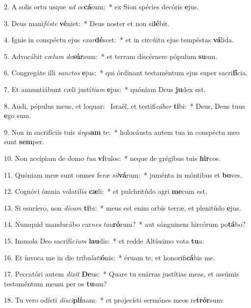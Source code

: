 2. A solis ortu usque \textit{ad} \textit{oc}\textbf{cá}sum:~*  ex Sion spécies decóris \textbf{e}jus.\

3. Deus mani\textit{fés}\textit{te} \textbf{vé}niet:~*  Deus noster et non si\textbf{lé}bit.\

4. Ignis in conspéctu ejus \textit{ex}\textit{ar}\textbf{dé}scet:~*  et in circúitu ejus tempéstas \textbf{vá}lida.\

5. Advocábit cæ\textit{lum} \textit{de}\textbf{súr}sum:~*  et terram discérnere pópulum \textbf{su}um.\

6. Congregáte illi \textit{sanc}\textit{tos} \textbf{e}jus:~*  qui órdinant testaméntum ejus super sacri\textbf{fí}cia.\

7. Et annuntiábunt cæli justí\textit{ti}\textit{am} \textbf{e}jus:~*  quóniam Deus \textbf{ju}dex est.\

8. Audi, pópulus meus, et loquar: \dag\  Israël, et testifi\textit{cá}\textit{bor} \textbf{ti}bi:~*  Deus, Deus tuus \textbf{e}go sum.\

9. Non in sacrifíciis tuis \textit{ár}\textit{gu}\textbf{am} te:~*  holocáusta autem tua in conspéctu meo sunt \textbf{sem}per.\

10. Non accípiam de domo \textit{tu}\textit{a} \textbf{ví}tulos:~*  neque de grégibus tuis \textbf{hir}cos.\

11. Quóniam meæ sunt omnes fe\textit{ræ} \textit{sil}\textbf{vá}rum:~*  juménta in móntibus et \textbf{bo}ves.\

12. Cognóvi ómnia volatí\textit{li}\textit{a} \textbf{cæ}li:~*  et pulchritúdo agri \textbf{me}cum est.\

13. Si esuríero, non \textit{di}\textit{cam} \textbf{ti}bi:~*  meus est enim orbis terræ, et plenitúdo \textbf{e}jus.\

14. Numquid manducábo car\textit{nes} \textit{tau}\textbf{ró}rum?~*  aut sánguinem hircórum po\textbf{tá}bo?\

15. Immola Deo sacrifí\textit{ci}\textit{um} \textbf{lau}dis:~*  et redde Altíssimo vota \textbf{tu}a.\

16. Et ínvoca me in die tribu\textit{la}\textit{ti}\textbf{ó}nis:~*  éruam te, et honorifi\textbf{cá}bis me.\

17. Peccatóri autem \textit{di}\textit{xit} \textbf{De}us:~*  Quare tu enárras justítias meas, et assúmis testaméntum meum per os \textbf{tu}um?\

18. Tu vero odísti \textit{di}\textit{sci}\textbf{plí}nam:~*  et projecísti sermónes meos re\textbf{trór}sum:\

